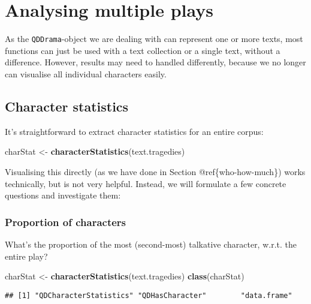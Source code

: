 \documentclass[]{book}
\newenvironment{Shaded}{\begin{snugshade}}{\end{snugshade}}
\newcommand{\KeywordTok}[1]{\textcolor[rgb]{0.13,0.29,0.53}{\textbf{#1}}}
\newcommand{\NormalTok}[1]{#1}
\newcommand{\StringTok}[1]{\textcolor[rgb]{0.31,0.60,0.02}{#1}}
\begin{document}
\hypertarget{analysing-multiple-plays}{%
\section{Analysing multiple plays}\label{analysing-multiple-plays}}

As the \texttt{QDDrama}-object we are dealing with can represent one or more texts, most functions can just be used with a text collection or a single text, without a difference. However, results may need to handled differently, because we no longer can visualise all individual characters easily.

\hypertarget{character-statistics}{%
\subsection{Character statistics}\label{character-statistics}}

It's straightforward to extract character statistics for an entire corpus:

\begin{Shaded}
\begin{Highlighting}[]
\NormalTok{charStat <-}\StringTok{ }\KeywordTok{characterStatistics}\NormalTok{(text.tragedies)}
\end{Highlighting}
\end{Shaded}

Visualising this directly (as we have done in Section @ref\{who-how-much\}) works technically, but is not very helpful. Instead, we will formulate a few concrete questions and investigate them:

\hypertarget{proportion-of-characters}{%
\subsubsection{Proportion of characters}\label{proportion-of-characters}}

What's the proportion of the most (second-most) talkative character, w.r.t. the entire play?

\begin{Shaded}
\begin{Highlighting}[]
\NormalTok{charStat <-}\StringTok{ }\KeywordTok{characterStatistics}\NormalTok{(text.tragedies)}
\KeywordTok{class}\NormalTok{(charStat)}
\end{Highlighting}
\end{Shaded}

\begin{verbatim}
## [1] "QDCharacterStatistics" "QDHasCharacter"        "data.frame"
\end{verbatim}
\end{document}

